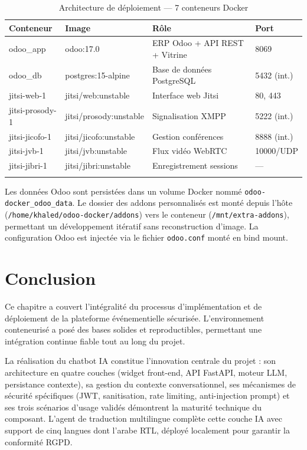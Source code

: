 \begin{longtable}{|m{3.5cm}|m{4cm}|m{3.5cm}|m{2cm}|}
\hline
\textbf{Conteneur} & \textbf{Image} & \textbf{Rôle} & \textbf{Port} \\
\hline
\endhead
\endfoot
\endlastfoot
\hline
odoo\_app & odoo:17.0 & ERP Odoo + API REST + Vitrine & 8069 \\
\hline
odoo\_db & postgres:15-alpine & Base de données PostgreSQL & 5432 (int.) \\
\hline
jitsi-web-1 & jitsi/web:unstable & Interface web Jitsi & 80, 443 \\
\hline
jitsi-prosody-1 & jitsi/prosody:unstable & Signalisation XMPP & 5222 (int.) \\
\hline
jitsi-jicofo-1 & jitsi/jicofo:unstable & Gestion conférences & 8888 (int.) \\
\hline
jitsi-jvb-1 & jitsi/jvb:unstable & Flux vidéo WebRTC & 10000/UDP \\
\hline
jitsi-jibri-1 & jitsi/jibri:unstable & Enregistrement sessions & — \\
\hline
\captionsetup{justification=centering,margin=2cm}
\caption{Architecture de déploiement — 7 conteneurs Docker}
\label{tab:deployment}
\end{longtable}

Les données Odoo sont persistées dans un volume Docker nommé \texttt{odoo-docker\_odoo\_data}. Le dossier des addons personnalisés est monté depuis l'hôte (\texttt{/home/khaled/odoo-docker/addons}) vers le conteneur (\texttt{/mnt/extra-addons}), permettant un développement itératif sans reconstruction d'image. La configuration Odoo est injectée via le fichier \texttt{odoo.conf} monté en bind mount.

\section*{Conclusion}
Ce chapitre a couvert l'intégralité du processus d'implémentation et de déploiement de la plateforme événementielle sécurisée. L'environnement conteneurisé a posé des bases solides et reproductibles, permettant une intégration continue fiable tout au long du projet.

La réalisation du chatbot IA constitue l'innovation centrale du projet : son architecture en quatre couches (widget front-end, API FastAPI, moteur LLM, persistance contexte), sa gestion du contexte conversationnel, ses mécanismes de sécurité spécifiques (JWT, sanitisation, rate limiting, anti-injection prompt) et ses trois scénarios d'usage validés démontrent la maturité technique du composant. L'agent de traduction multilingue complète cette couche IA avec support de cinq langues dont l'arabe RTL, déployé localement pour garantir la conformité RGPD.

